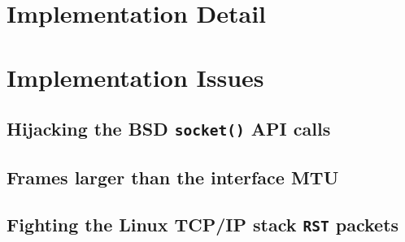 \documentclass[11pt,a4paper,british]{bhamarticle}
\begin{document}
\begin{multicols}{2}
\section{Implementation Detail}





\section{Implementation Issues}
\subsection{Hijacking the BSD \texttt{socket()} API calls} %

\subsection{Frames larger than the interface MTU}

\subsection{Fighting the Linux TCP/IP stack \texttt{RST} packets}


\end{multicols}
\end{document}
